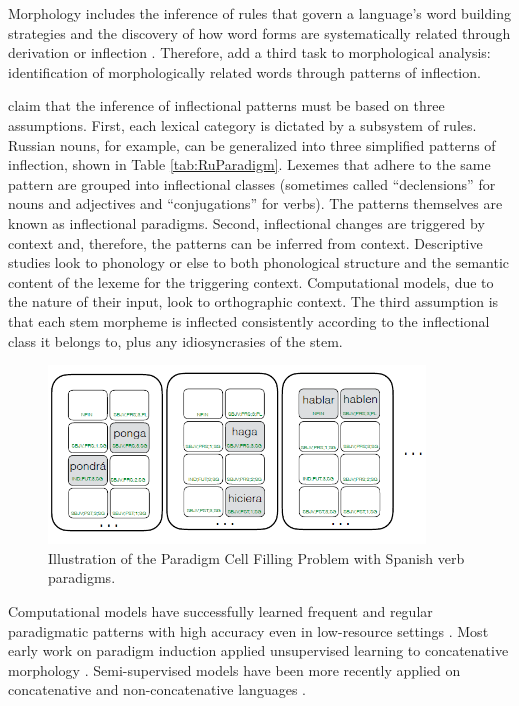 Morphology includes the inference of rules that govern a language’s word building strategies and the discovery of how word forms are systematically related through derivation or inflection \citep{roark_computational_2007}. Therefore, \cite{virpioja_empirical_2011} add a third task to morphological analysis: identification of morphologically related words through patterns of inflection.

\cite{durrett_supervised_2013} claim that the inference of inflectional patterns must be based on three assumptions. First, each lexical category is dictated by a subsystem of rules. Russian nouns, for example, can be generalized into three simplified patterns of inflection, shown in Table \ref{tab:RuParadigm}. Lexemes that adhere to the same pattern are grouped into inflectional classes (sometimes called ``declensions'' for nouns and adjectives and ``conjugations'' for verbs). The patterns themselves are known as inflectional paradigms. Second, inflectional changes are triggered by context and, therefore, the patterns can be inferred from context. Descriptive studies look to phonology or else to both phonological structure and the semantic content of the lexeme for the triggering context. Computational models, due to the nature of their input, look to orthographic context. The third assumption is that each stem morpheme is inflected consistently according to the inflectional class it belongs to, plus any idiosyncrasies of the stem.

\begin{figure}[b]
\begin{center}
\includegraphics[width=10cm]{figs/PCFP.PNG}
\caption[Paradigm Cell Filling Problem]{Illustration of the Paradigm Cell Filling Problem \citep{silfverberg_encoder-decoder_2018} with Spanish verb paradigms.}
\label{fig:PCFP}
\end{center}
\end{figure}

Computational models have successfully learned frequent and regular paradigmatic patterns with high accuracy even in low-resource settings \citep{hammarstrom_unsupervised_2011,durrett_supervised_2013,ahlberg_semi-supervised_2014}. Most early work on paradigm induction applied unsupervised learning to concatenative morphology \citep{goldsmith_unsupervised_2001,chan_learning_2006,monson_paramorfinding_2007b}. Semi-supervised models have been more recently applied on concatenative and non-concatenative languages \citep{dreyer_discovering_2011,durrett_supervised_2013}. 

